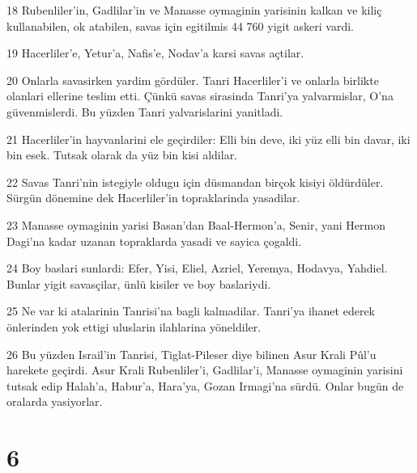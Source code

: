 \par 18 Rubenliler'in, Gadlilar'in ve Manasse oymaginin yarisinin kalkan ve kiliç kullanabilen, ok atabilen, savas için egitilmis 44 760 yigit askeri vardi.
\par 19 Hacerliler'e, Yetur'a, Nafis'e, Nodav'a karsi savas açtilar.
\par 20 Onlarla savasirken yardim gördüler. Tanri Hacerliler'i ve onlarla birlikte olanlari ellerine teslim etti. Çünkü savas sirasinda Tanri'ya yalvarmislar, O'na güvenmislerdi. Bu yüzden Tanri yalvarislarini yanitladi.
\par 21 Hacerliler'in hayvanlarini ele geçirdiler: Elli bin deve, iki yüz elli bin davar, iki bin esek. Tutsak olarak da yüz bin kisi aldilar.
\par 22 Savas Tanri'nin istegiyle oldugu için düsmandan birçok kisiyi öldürdüler. Sürgün dönemine dek Hacerliler'in topraklarinda yasadilar.
\par 23 Manasse oymaginin yarisi Basan'dan Baal-Hermon'a, Senir, yani Hermon Dagi'na kadar uzanan topraklarda yasadi ve sayica çogaldi.
\par 24 Boy baslari sunlardi: Efer, Yisi, Eliel, Azriel, Yeremya, Hodavya, Yahdiel. Bunlar yigit savasçilar, ünlü kisiler ve boy baslariydi.
\par 25 Ne var ki atalarinin Tanrisi'na bagli kalmadilar. Tanri'ya ihanet ederek önlerinden yok ettigi uluslarin ilahlarina yöneldiler.
\par 26 Bu yüzden Israil'in Tanrisi, Tiglat-Pileser diye bilinen Asur Krali Pûl'u harekete geçirdi. Asur Krali Rubenliler'i, Gadlilar'i, Manasse oymaginin yarisini tutsak edip Halah'a, Habur'a, Hara'ya, Gozan Irmagi'na sürdü. Onlar bugün de oralarda yasiyorlar.

\chapter{6}


